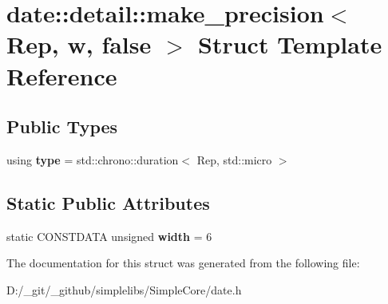 \hypertarget{structdate_1_1detail_1_1make__precision_3_01_rep_00_01w_00_01false_01_4}{}\section{date\+::detail\+::make\+\_\+precision$<$ Rep, w, false $>$ Struct Template Reference}
\label{structdate_1_1detail_1_1make__precision_3_01_rep_00_01w_00_01false_01_4}
\subsection*{Public Types}
\begin{DoxyCompactItemize}
\item 
\mbox{\label{structdate_1_1detail_1_1make__precision_3_01_rep_00_01w_00_01false_01_4_a7a73becfc21adb1e51fc724b5675e0a0}} 
using {\bfseries type} = std\+::chrono\+::duration$<$ Rep, std\+::micro $>$
\end{DoxyCompactItemize}
\subsection*{Static Public Attributes}
\begin{DoxyCompactItemize}
\item 
\mbox{\label{structdate_1_1detail_1_1make__precision_3_01_rep_00_01w_00_01false_01_4_a24e943e0fe3bc07c3c739fcb87b77210}} 
static C\+O\+N\+S\+T\+D\+A\+TA unsigned {\bfseries width} = 6
\end{DoxyCompactItemize}


The documentation for this struct was generated from the following file\+:\begin{DoxyCompactItemize}
\item 
D\+:/\+\_\+git/\+\_\+github/simplelibs/\+Simple\+Core/date.\+h\end{DoxyCompactItemize}
